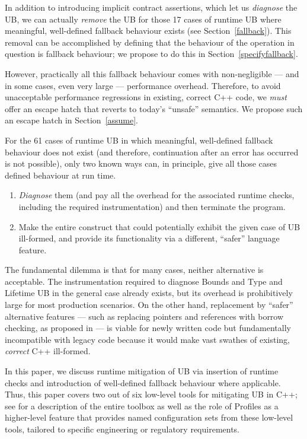 {In addition to introducing implicit contract assertions, which let us \emph{diagnose} the UB, we can actually \emph{remove} the UB for those 17 cases of runtime UB where meaningful, well-defined fallback behaviour exists (see Section~\ref{fallback}). This removal can be accomplished by defining that the behaviour of the operation in question is fallback behaviour; we propose to do this in Section~\ref{specifyfallback}.

However, practically all this fallback behaviour comes with non-negligible --- and in some cases, even very large --- performance overhead. Therefore, to avoid unacceptable performance regressions in existing, correct C++ code, we \emph{must} offer an escape hatch that reverts to today's ``unsafe'' semantics. We propose such an escape hatch in Section~\ref{assume}.

For the 61 cases of runtime UB in which meaningful, well-defined fallback behaviour does not exist (and therefore, continuation after an error has occurred is not possible), only two known ways can, in principle, give all those cases defined behaviour at run time.
\begin{enumerate}
\renewcommand{\labelenumi}{\arabic{enumi}.}
\item \emph{Diagnose} them (and pay all the overhead for the associated runtime checks, including the required instrumentation) and then terminate the program.
\item Make the entire construct that could potentially exhibit the given case of UB ill-formed, and provide its functionality via a different, ``safer'' language feature.
\end{enumerate}

The fundamental dilemma is that for many cases, neither alternative is acceptable. The instrumentation required to diagnose Bounds and Type and Lifetime UB in the general case already exists, but its overhead is prohibitively large for most production scenarios. On the other hand, replacement by ``safer'' alternative features --- such as replacing pointers and references with borrow checking, as proposed in \cite{P3390R0} --- is viable for newly written code but fundamentally incompatible with legacy code because it would make vast swathes of existing, \emph{correct} C++ ill-formed.

In this paper, we discuss runtime mitigation of UB via insertion of runtime checks and introduction of well-defined fallback behaviour where applicable. Thus, this paper covers two out of six low-level tools for mitigating UB in C++; see \cite{P3756R0} %
for a description of the entire toolbox as well as the role of Profiles as a higher-level feature that provides named configuration sets from these low-level tools, tailored to specific engineering or regulatory requirements.

}
